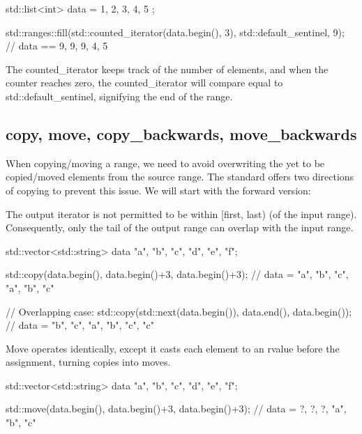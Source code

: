 \begin{box-note}
\begin{cppcode}
std::list<int> data = { 1, 2, 3, 4, 5 };

std::ranges::fill(std::counted_iterator(data.begin(), 3), std::default_sentinel, 9);
// data == { 9, 9, 9, 4, 5 }
\end{cppcode}
\end{box-note}

The counted\_iterator keeps track of the number of elements, and when the counter reaches zero, the counted\_iterator will compare equal to std::default\_sentinel, signifying the end of the range.

\subsection{copy, move, copy\_backwards, move\_backwards}

When copying/moving a range, we need to avoid overwriting the yet to be copied/moved elements from the source range. The standard offers two directions of copying to prevent this issue. We will start with the forward version:



The output iterator is not permitted to be within [first, last) (of the input range). Consequently, only the tail of the output range can overlap with the input range.

\begin{box-note}
\begin{cppcode}
std::vector<std::string> data{ "a", "b", "c", "d", "e", "f"};

std::copy(data.begin(), data.begin()+3, data.begin()+3);
// data = { "a", "b", "c", "a", "b", "c" }

// Overlapping case:
std::copy(std::next(data.begin()), data.end(), data.begin());
// data = { "b", "c", "a", "b", "c", "c" }
\end{cppcode}
\end{box-note}

Move operates identically, except it casts each element to an rvalue before the assignment, turning copies into moves.

\begin{box-note}
\begin{cppcode}
std::vector<std::string> data{ "a", "b", "c", "d", "e", "f"};

std::move(data.begin(), data.begin()+3, data.begin()+3);
// data = { ?, ?, ?, "a", "b", "c" }
\end{cppcode}
\end{box-note}

